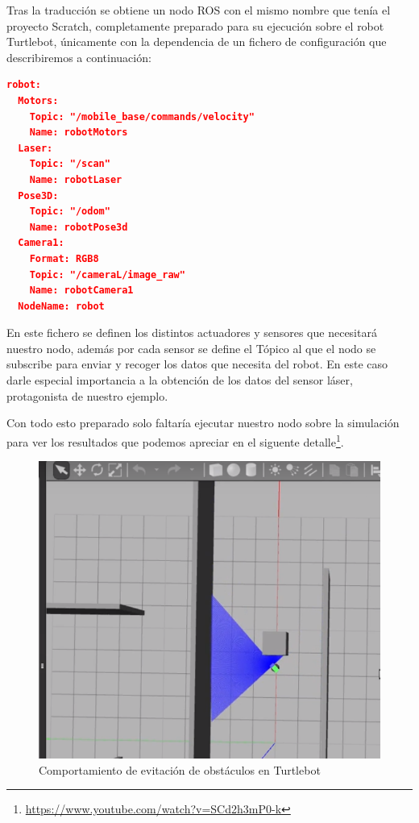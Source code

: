 Tras la traducción se obtiene un nodo ROS con el mismo nombre que tenía el proyecto Scratch, completamente preparado para su ejecución sobre el robot Turtlebot, únicamente con la dependencia de un fichero de configuración que describiremos a continuación:
\begin{lstlisting}[language=json,firstnumber=1]
robot:
  Motors:
    Topic: "/mobile_base/commands/velocity"
    Name: robotMotors
  Laser:
    Topic: "/scan"
    Name: robotLaser
  Pose3D:
    Topic: "/odom"
    Name: robotPose3d
  Camera1:
    Format: RGB8
    Topic: "/cameraL/image_raw"
    Name: robotCamera1
  NodeName: robot
\end{lstlisting}
En este fichero se definen los distintos actuadores y sensores que necesitará nuestro nodo, además por cada sensor se define el Tópico al que el nodo se subscribe para enviar y recoger los datos que necesita del robot. En este caso darle especial importancia a la obtención de los datos del sensor láser, protagonista de nuestro ejemplo.

Con todo esto preparado solo faltaría ejecutar nuestro nodo sobre la simulación para ver los resultados que podemos apreciar en el siguente detalle\footnote{\url{https://www.youtube.com/watch?v=SCd2h3mP0-k}}.

\begin{figure}[H]
    \centering
    \includegraphics[scale=0.75]{img/robot-example.PNG}
  	\caption{Comportamiento de evitación de obstáculos en Turtlebot}
  	\label{turtlebot-scr}
\end{figure}


